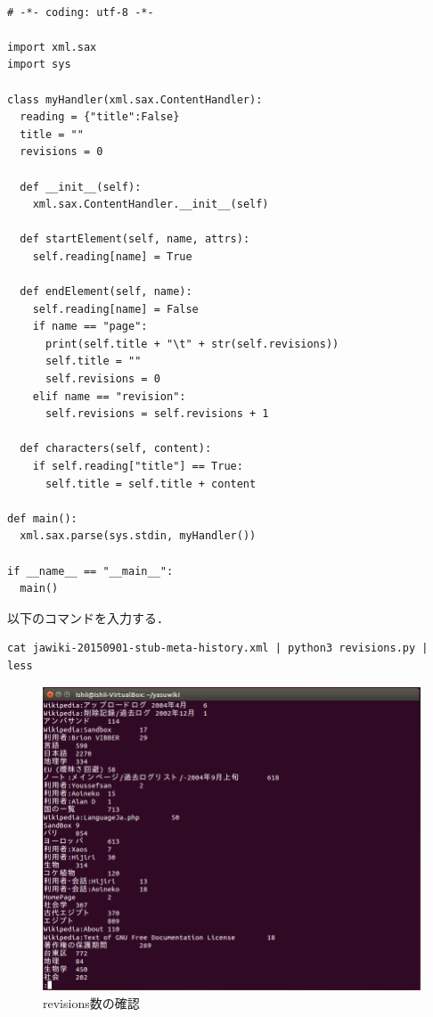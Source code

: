 {\small
\begin{verbatim}

# -*- coding: utf-8 -*-

import xml.sax
import sys

class myHandler(xml.sax.ContentHandler):
  reading = {"title":False}
  title = ""
  revisions = 0

  def __init__(self):
    xml.sax.ContentHandler.__init__(self)
 
  def startElement(self, name, attrs):
    self.reading[name] = True
 
  def endElement(self, name):
    self.reading[name] = False
    if name == "page":
      print(self.title + "\t" + str(self.revisions))
      self.title = ""
      self.revisions = 0
    elif name == "revision":
      self.revisions = self.revisions + 1
 
  def characters(self, content):
    if self.reading["title"] == True:
      self.title = self.title + content
  
def main():
  xml.sax.parse(sys.stdin, myHandler())
 
if __name__ == "__main__":
  main()

\end{verbatim}}





以下のコマンドを入力する． \\

{\small
\begin{verbatim}
cat jawiki-20150901-stub-meta-history.xml | python3 revisions.py | less
\end{verbatim}}


\begin{figure}[H]
\centering
\includegraphics[width=14cm]{wiki_revisions.png}
\caption{revisions数の確認}\label{サンプル図}
\end{figure}

